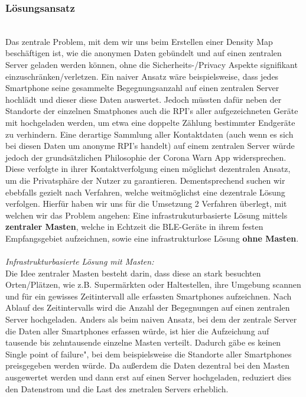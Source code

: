 \documentclass[conference]{IEEEtran}
\begin{document}
\subsubsection{Lösungsansatz} 
\text{ }\\
Das zentrale Problem, mit dem wir uns beim Erstellen einer Density Map beschäftigen ist, wie die anonymen Daten gebündelt und auf einen zentralen Server geladen werden können, ohne die Sicherheits-/Privacy Aspekte signifikant einzuschränken/verletzen. 
Ein naiver Ansatz wäre beispielsweise, dass jedes Smartphone seine gesammelte Begegnungsanzahl auf einen zentralen Server hochlädt und dieser diese Daten auswertet. 
Jedoch müssten dafür neben der Standorte der einzelnen Smatphones auch die RPI's aller aufgezeichneten Geräte mit hochgeladen werden, um etwa eine doppelte Zählung bestimmter Endgeräte zu verhindern. 
Eine derartige Sammlung aller Kontaktdaten (auch wenn es sich bei diesen Daten um anonyme RPI's handelt) auf einem zentralen Server würde jedoch der grundsätzlichen Philosophie der Corona Warn App widersprechen.
Diese verfolgte in ihrer Kontaktverfolgung einen möglichst dezentralen Ansatz, um die Privatsphäre der Nutzer zu garantieren.
Dementsprechend suchen wir ebebfalls gezielt nach Verfahren, welche weitmöglichst eine dezentrale Lösung verfolgen. 
Hierfür haben wir uns für die Umsetzung 2 Verfahren überlegt, mit welchen wir das Problem angehen: Eine infrastrukuturbasierte Lösung mittels \textbf{zentraler Masten}, welche in Echtzeit die BLE-Geräte in ihrem festen Empfangsgebiet aufzeichnen, sowie eine infrastrukturlose Lösung \textbf{ohne Masten}. \\ \\
\textit{Infrastrukturbasierte Lösung mit Masten: }\\
Die Idee zentraler Masten besteht darin, dass diese an stark besuchten Orten/Plätzen, wie z.B. Supermärkten oder Haltestellen, ihre Umgebung scannen und für ein gewisses Zeitintervall alle erfassten Smartphones aufzeichnen. 
Nach Ablauf des Zeitintervalls wird die Anzahl der Begegnungen auf einen zentralen Server hochgeladen.
Anders als beim naiven Ansatz, bei dem der zentrale Server die Daten aller Smartphones erfassen würde, ist hier die Aufzeichung auf tausende bis zehntausende einzelne Masten verteilt. 
Dadurch gäbe es keinen \glqq Single point of failure", bei dem beispielsweise die Standorte aller Smartphones preisgegeben werden würde. 
Da außerdem die Daten dezentral bei den Masten ausgewertet werden und dann erst auf einen Server hochgeladen, reduziert dies den Datenstrom und die Last des znetralen Servers erheblich. 
\end{document}
